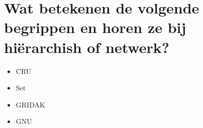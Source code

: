 \newpage

\section{Wat betekenen de volgende begrippen en horen ze bij hiërarchish of netwerk?}

\begin{itemize}
\item CRU
\item Set
\item GRIDAK
\item GNU

\end{itemize}